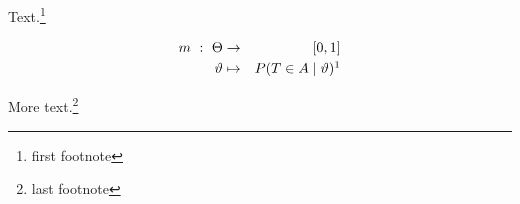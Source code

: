 \documentclass{article}
\begin{document}
Text.\footnote{first footnote}

\begin{eqnarray*}
  m\ :\ \Theta  & \rightarrow  & [0,1]\\
  \vartheta & \mapsto & P(T \in A \mid \vartheta)\footnotemark
\end{eqnarray*}

More text.\footnote{last footnote}
\end{document}
